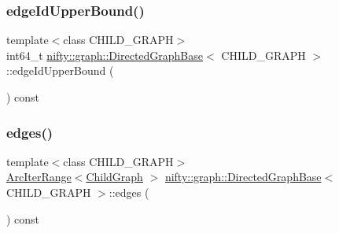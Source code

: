 \subsubsection{\texorpdfstring{edge\+Id\+Upper\+Bound()}{edgeIdUpperBound()}}
{\footnotesize\ttfamily template$<$class C\+H\+I\+L\+D\+\_\+\+G\+R\+A\+PH$>$ \\
int64\+\_\+t \hyperlink{classnifty_1_1graph_1_1DirectedGraphBase}{nifty\+::graph\+::\+Directed\+Graph\+Base}$<$ C\+H\+I\+L\+D\+\_\+\+G\+R\+A\+PH $>$\+::edge\+Id\+Upper\+Bound (\begin{DoxyParamCaption}{ }\end{DoxyParamCaption}) const\hspace{0.3cm}{\ttfamily [inline]}}

\mbox{\label{classnifty_1_1graph_1_1DirectedGraphBase_ac98d32be1691c74f0547e27bc6003446}} 
\subsubsection{\texorpdfstring{edges()}{edges()}}
{\footnotesize\ttfamily template$<$class C\+H\+I\+L\+D\+\_\+\+G\+R\+A\+PH$>$ \\
\hyperlink{structnifty_1_1graph_1_1DirectedGraphBase_1_1ArcIterRange}{Arc\+Iter\+Range}$<$\hyperlink{classnifty_1_1graph_1_1DirectedGraphBase_a583e01641aec296b9bc33a346f90a216}{Child\+Graph} $>$ \hyperlink{classnifty_1_1graph_1_1DirectedGraphBase}{nifty\+::graph\+::\+Directed\+Graph\+Base}$<$ C\+H\+I\+L\+D\+\_\+\+G\+R\+A\+PH $>$\+::edges (\begin{DoxyParamCaption}{ }\end{DoxyParamCaption}) const\hspace{0.3cm}{\ttfamily [inline]}}

\mbox{\label{classnifty_1_1graph_1_1DirectedGraphBase_a49976a6e82bc84a7a2827e0e8592fc1a}} 
